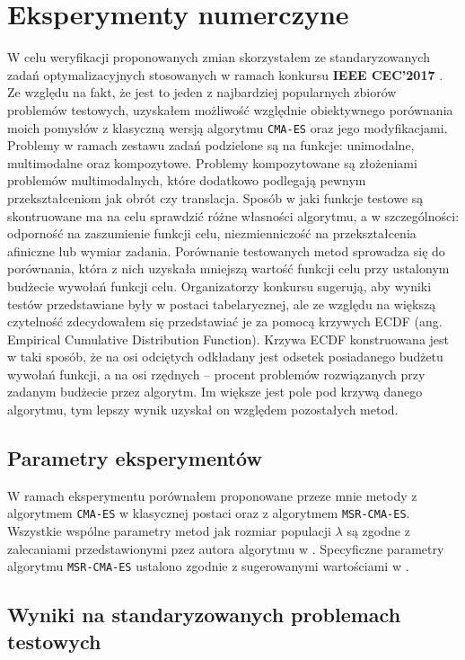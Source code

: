 \section{Eksperymenty numerczyne}
  W celu weryfikacji proponowanych zmian skorzystałem ze standaryzowanych zadań optymalizacyjnych stosowanych w ramach konkursu
  \textbf{IEEE CEC'2017} \cite{cec2017}. Ze względu na fakt, że jest to jeden z najbardziej popularnych zbiorów problemów testowych, uzyskałem
  możliwość względnie obiektywnego porównania moich pomysłów z klasyczną wersją algorytmu \texttt{CMA-ES} oraz jego modyfikacjami.
  Problemy w ramach zestawu zadań podzielone są na funkcje: unimodalne, multimodalne oraz kompozytowe. Problemy kompozytowane są
  złożeniami problemów multimodalnych, które dodatkowo podlegają pewnym przekształceniom jak obrót czy translacja.
  Sposób w jaki funkcje testowe są skontruowane ma na celu sprawdzić różne własności algorytmu, a w szczególności: odporność na zaszumienie funkcji celu,
  niezmienniczość na przekształcenia afiniczne lub wymiar zadania.
  Porównanie testowanych metod sprowadza się do porównania, która z nich uzyskała mniejszą wartość funkcji celu przy ustalonym budżecie wywołań funkcji celu.
  Organizatorzy konkursu sugerują, aby wyniki testów przedstawiane były w postaci tabelarycznej, ale ze względu na większą czytelność zdecydowałem się przedstawiać je za pomocą krzywych ECDF (ang. Empirical Cumulative Distribution Function). Krzywa ECDF konstruowana jest w taki sposób, że na osi odciętych odkładany jest odsetek posiadanego budżetu wywołań funkcji, a na osi rzędnych -- procent problemów rozwiązanych przy zadanym budżecie przez algorytm. Im większe jest pole pod krzywą danego algorytmu, tym lepszy wynik uzyskał on względem pozostałych metod.
  

\subsection{Parametry eksperymentów}
  W ramach eksperymentu porównałem proponowane przeze mnie metody z algorytmem \texttt{CMA-ES} w klasycznej postaci oraz z algorytmem \texttt{MSR-CMA-ES}.
  Wszystkie wspólne parametry metod jak rozmiar populacji $\lambda$ są zgodne z zalecaniami przedstawionymi pzez autora algorytmu w \cite{cmaes-tutorial}.
  Specyficzne parametry algorytmu \texttt{MSR-CMA-ES} ustalono zgodnie z sugerowanymi wartościami w \cite{cmaes-msr}. 

\subsection{Wyniki na standaryzowanych problemach testowych}

